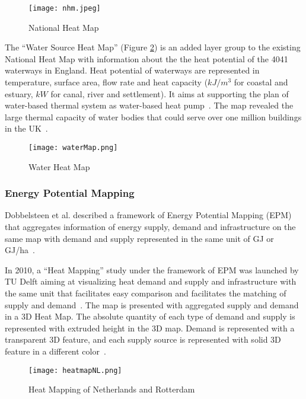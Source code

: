 \documentclass[hidelinks,12pt]{article}
\newcommand{\fref}[1]{Figure \ref{#1}}
\begin{document}
\begin{figure}[h!]
  \centering
  \texttt{[image: nhm.jpeg]}
  \caption{National Heat Map~\cite{heatMap2012}}
  \label{fig:nhm}
\end{figure}

The ``Water Source Heat Map'' (\fref{fig:waterMap}) is an added layer
group to the existing National Heat Map with information about the the
heat potential of the 4041 waterways in England. Heat potential of
waterways are represented in temperature, surface area, flow rate and
heat capacity ($kJ/m^3$ for coastal and estuary, $kW$ for canal, river
and settlement). It aims at supporting the plan of water-based thermal
system as water-based heat pump~\cite{waterHeatMap}. The map revealed
the large thermal capacity of water bodies that could serve over one
million buildings in the UK~\cite{waterHeatMap}.

\begin{figure}[h!]
  \centering
  \texttt{[image: waterMap.png]}
  \caption{Water Heat Map~\cite{waterHeatMap}}
  \label{fig:waterMap}
\end{figure}

\subsubsection{Energy Potential Mapping}
Dobbelsteen et al. described a framework of Energy Potential Mapping
(EPM) that aggregates information of energy supply, demand and
infrastructure on the same map with demand and supply represented in
the same unit of GJ or GJ/ha~\cite{Dobbelsteen2013}.

In 2010, a ``Heat Mapping'' study under the framework of EPM was
launched by TU Delft aiming at visualizing heat demand and supply and
infrastructure with the same unit that facilitates easy comparison and
facilitates the matching of supply and
demand~\cite{Dobbelsteen2013}. The map is presented with aggregated
supply and demand in a 3D Heat Map. The absolute quantity of each type
of demand and supply is represented with extruded height in the 3D
map. Demand is represented with a transparent 3D feature, and each
supply source is represented with solid 3D feature in a different
color~\cite{Dobbelsteen2013}.

\begin{figure}[htbp]
  \centering
  \texttt{[image: heatmapNL.png]}
  \caption{Heat Mapping of Netherlands and
    Rotterdam~\cite{Dobbelsteen2013}}
  \label{fig:heatmapNL}
\end{figure}
\end{document}
